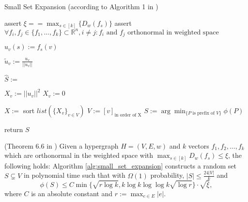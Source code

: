 \begin{algorithm}[H]
	\caption{Small Set Expansion (according to Algorithm 1 in \cite{ChanLTZ16}) \label{alg:small_set_expansion}} %
	
	
	\begin{algorithmic}
		\State assert $\xi == \max_{s\in [k]} \{D_w(f_s)\}$
		\State assert $\forall f_i, f_j \in \{f_1, \ldots , f_k\} \subset \mathbb{R}^n, i\neq j: f_i \text{ and } f_j \text{ orthonormal in weighted space} $
		
		\State	$u_v(s) := f_s(v) $
		\EndFor
		\EndFor
		
		\State $\tilde{u}_v := \frac{u_v}{||u_v||}$
		\EndFor
		
		\State $\hat{S} := $ 
		

		\State $X_v := ||u_v||^2$
		\Else
		\State $X_v := 0$
		\EndIf
		
		\EndFor
		\State $X:= $ sort $ list(\{X_v\}_{v \in V})$
		\State $V := [v]_{\text{in order of X}}$
		\State $S := \arg \min_{\{P \text{ is prefix of }V\}}\phi(P)$
		
		\State return $S$
		
	
	
		\EndFunction
		
		
	\end{algorithmic}
\end{algorithm} %
\begin{theorem}{(Theorem 6.6 in \cite{ChanLTZ16})}\label{theorem:small_xi}
	Given a hypergraph $H = (V, E, w)$ and $k$ vectors $f_1, f_2, \ldots , f_k$ which are orthonormal in the weighted space with $ \max_{s \in [k]} D_w(f_s) \le \xi $, the following holds: Algorithm \ref{alg:small_set_expansion} constructs a random set $S \subsetneq V$ in polynomial time such that with $\Omega(1)$ probability, $|S| \le \frac{24|V|}{k}$ and
	\begin{equation}\label{eq:small_expansion}
	\phi(S) \le C \min\{\sqrt{r \log k}, k \log k  \log \log k \sqrt{\log r} \} \cdot \sqrt{\xi},
	\end{equation}
	where $C$ is an absolute constant and $r := \max_{e\in E} |e|$.
\end{theorem}



